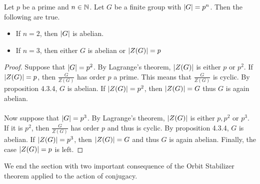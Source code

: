 \documentclass[a4paper]{article}
\begin{document}
\begin{crl}{}{} Let $p$ be a prime and $n\in\mathbb{N}$. Let $G$ be a finite group with $\abs{G}=p^n$. Then the following are true. 
\begin{itemize}
\item If $n=2$, then $\abs{G}$ is abelian. 
\item If $n=3$, then either $G$ is abelian or $\abs{Z(G)}=p$
\end{itemize} \tcbline
\begin{proof}
Suppose that $\abs{G}=p^2$. By Lagrange's theorem, $\abs{Z(G)}$ is either $p$ or $p^2$. If $\abs{Z(G)}=p$, then $\frac{G}{Z(G)}$ has order $p$ a prime. This means that $\frac{G}{Z(G)}$ is cyclic. By proposition 4.3.4, $G$ is abelian. If $\abs{Z(G)}=p^2$, then $\abs{Z(G)}=G$ thus $G$ is again abelian. \\~\\

Now suppose that $\abs{G}=p^3$. By Lagrange's theorem, $\abs{Z(G)}$ is either $p,p^2$ or $p^3$. If it is $p^2$, then $\frac{G}{Z(G)}$ has order $p$ and thus is cyclic. By proposition 4.3.4, $G$ is abelian. If $\abs{Z(G)}=p^3$, then $\abs{Z(G)}=G$ and thus $G$ is again abelian. Finally, the case $\abs{Z(G)}=p$ is left. 
\end{proof}
\end{crl}

We end the section with two important consequence of the Orbit Stabilizer theorem applied to the action of conjugacy. 
\end{document}
